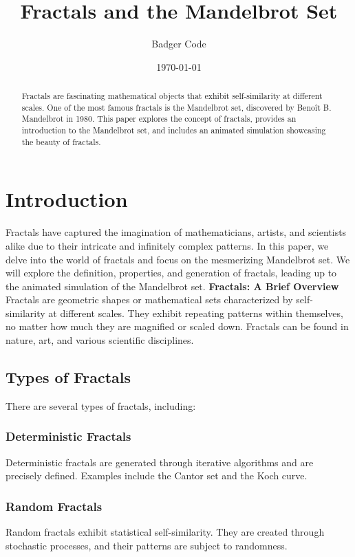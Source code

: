 \documentclass{article}
\title{Fractals and the Mandelbrot Set}
\author{Badger Code}
\date{\today}
\begin{document}
\maketitle
\newpage

\begin{abstract}
Fractals are fascinating mathematical objects that exhibit self-similarity at different scales. One of the most famous fractals is the Mandelbrot set, discovered by Benoît B. Mandelbrot in 1980. This paper explores the concept of fractals, provides an introduction to the Mandelbrot set, and includes an animated simulation showcasing the beauty of fractals.
\end{abstract}

\section{Introduction}
Fractals have captured the imagination of mathematicians, artists, and scientists alike due to their intricate and infinitely complex patterns. In this paper, we delve into the world of fractals and focus on the mesmerizing Mandelbrot set. We will explore the definition, properties, and generation of fractals, leading up to the animated simulation of the Mandelbrot set.
\textbf{Fractals: A Brief Overview}
Fractals are geometric shapes or mathematical sets characterized by self-similarity at different scales. They exhibit repeating patterns within themselves, no matter how much they are magnified or scaled down. Fractals can be found in nature, art, and various scientific disciplines.

\subsection{Types of Fractals}
There are several types of fractals, including:

\subsubsection{Deterministic Fractals}
Deterministic fractals are generated through iterative algorithms and are precisely defined. Examples include the Cantor set and the Koch curve.

\subsubsection{Random Fractals}
Random fractals exhibit statistical self-similarity. They are created through stochastic processes, and their patterns are subject to randomness.
\end{document}
